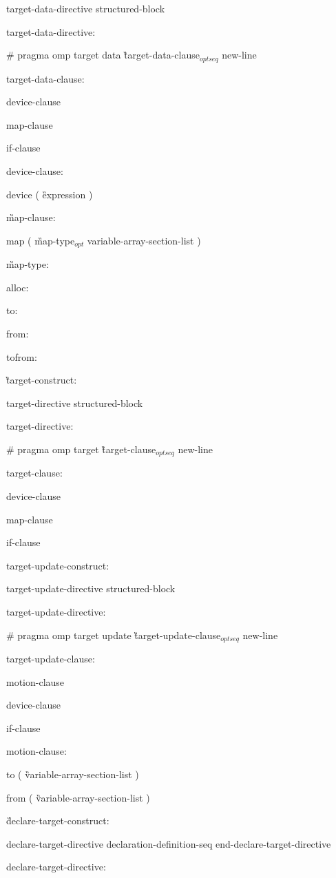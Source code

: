 {\I target-data-directive structured-block

target-data-directive:

\C\I \# pragma omp target data \G target-data-clause$_{optseq}$ new-line

target-data-clause:

\I device-clause

\I map-clause

\I if-clause

device-clause:

\C\I device ( \G expression \C )

\G map-clause:

\C\I map ( \G map-type$_{opt}$ variable-array-section-list \C )

\G map-type:

\C\I alloc:

\I to:

\I from:

\I tofrom:

\G target-construct:

\I target-directive structured-block

target-directive:

\C\I \# pragma omp target \G target-clause$_{optseq}$ new-line

target-clause:

\I device-clause

\I map-clause

\I if-clause

target-update-construct:

\I target-update-directive structured-block

target-update-directive:

\C\I \# pragma omp target update \G target-update-clause$_{optseq}$ new-line

target-update-clause:

\I motion-clause

\I device-clause

\I if-clause

motion-clause:

\C\I to ( \G variable-array-section-list \C )

\C\I from ( \G variable-array-section-list \C )

\G declare-target-construct:

\I declare-target-directive declaration-definition-seq end-declare-target-directive

declare-target-directive:

}
